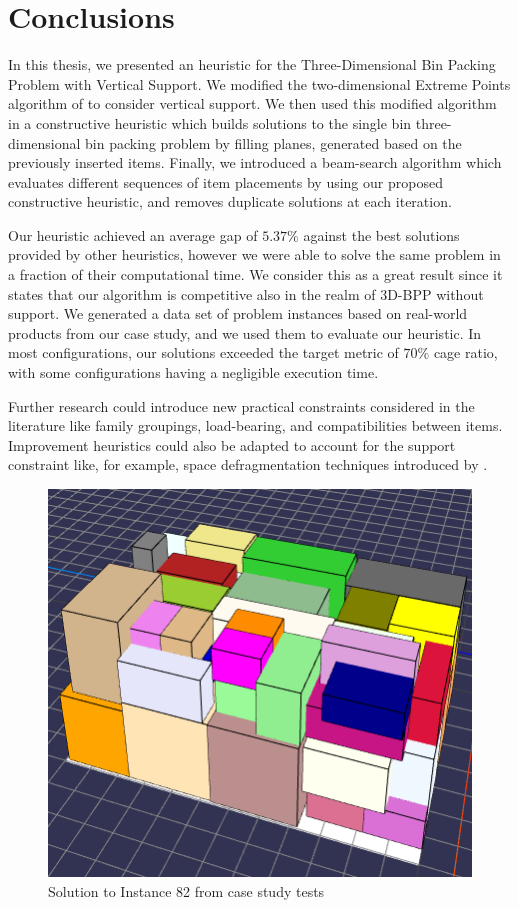 \documentclass[11pt,a4paper,twocolumn]{article}
\begin{document}
\section{Conclusions}
In this thesis, we presented an heuristic for the Three-Dimensional Bin Packing Problem with Vertical Support.
We modified the two-dimensional Extreme Points algorithm of \citet{crainic2008extreme} to consider vertical support.
We then used this modified algorithm in a constructive heuristic which builds solutions to the single bin three-dimensional bin packing problem by filling planes, generated based on the previously inserted items.
Finally, we introduced a beam-search algorithm which evaluates different sequences of item placements by using our proposed constructive heuristic, and removes duplicate solutions at each iteration.

Our heuristic achieved an average gap of $5.37\%$ against the best solutions provided by other heuristics, however we were able to solve the same problem in a fraction of their computational time.
We consider this as a great result since it states that our algorithm is competitive also in the realm of 3D-BPP without support.
We generated a data set of problem instances based on real-world products from our case study, and we used them to evaluate our heuristic.
In most configurations, our solutions exceeded the target metric of $70\%$ cage ratio, with some configurations having a negligible execution time.

Further research could introduce new practical constraints considered in the literature like family groupings, load-bearing, and compatibilities between items.
Improvement heuristics could also be adapted to account for the support constraint like, for example, space defragmentation techniques introduced by \cite{ZHU2012452}.

\begin{figure}
    \centering
    \includegraphics[width = \columnwidth]{tests/usecase/instance-82_k200.PNG}
    \caption{Solution to Instance 82 from case study tests}
\end{figure}
\end{document}
